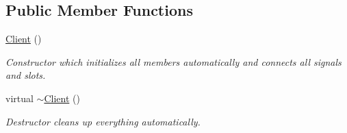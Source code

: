 \subsection*{Public Member Functions}
\begin{DoxyCompactItemize}
\item 
\hyperlink{class_client_ae51af7aa6b8f591496a8f6a4a87a14bf}{Client} ()
\begin{DoxyCompactList}\small\item\em Constructor which initializes all members automatically and connects all signals and slots. \end{DoxyCompactList}\item 
virtual \hyperlink{class_client_a840e519ca781888cbd54181572ebe3a7}{$\sim$\+Client} ()
\begin{DoxyCompactList}\small\item\em Destructor cleans up everything automatically. \end{DoxyCompactList}\end{DoxyCompactItemize}
